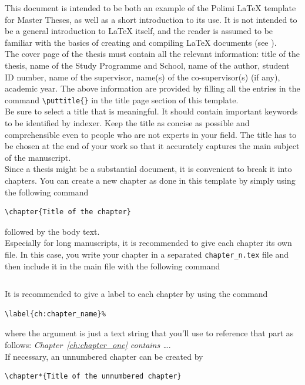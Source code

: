 \documentclass{Configuration_Files/PoliMi3i_thesis}
\begin{document}
This document is intended to be both an example of the Polimi \LaTeX{} template for Master Theses,
as well as a short introduction to its use. It is not intended to be a general introduction to \LaTeX{} itself,
and the reader is assumed to be familiar with the basics of creating and compiling \LaTeX{} documents (see \cite{oetiker1995not, kottwitz2015latex}).
\\
The cover page of the thesis must contain all the relevant information:
title of the thesis, name of the Study Programme and School, name of the author,
student ID number, name of the supervisor, name(s) of the co-supervisor(s) (if any), academic year.
The above information are provided by filling all the entries in the command \verb|\puttitle{}|
in the title page section of this template.
\\
Be sure to select a title that is meaningful.
It should contain important keywords to be identified by indexer.
Keep the title as concise as possible and comprehensible even to people who are not experts in your field.
The title has to be chosen at the end of your work so that it accurately captures the main subject of the manuscript.
\\
Since a thesis might be a substantial document, it is convenient to break it into chapters.
You can create a new chapter as done in this template by simply using the following command
\begin{verbatim}
\chapter{Title of the chapter}
\end{verbatim}
followed by the body text.
\\
Especially for long manuscripts, it is recommended to give each chapter its own file.
In this case, you write your chapter in a separated \verb|chapter_n.tex| file
and then include it in the main file with the following command
\begin{verbatim}

\end{verbatim}
It is recommended to give a label to each chapter by using the command
\begin{verbatim}
\label{ch:chapter_name}%
\end{verbatim}
where the argument is just a text string that you'll use to reference that part
as follows: \textit{Chapter~\ref{ch:chapter_one} contains   \dots}.\\
If necessary, an unnumbered chapter can be created by
\begin{verbatim}
\chapter*{Title of the unnumbered chapter}
\end{verbatim}
\end{document}
